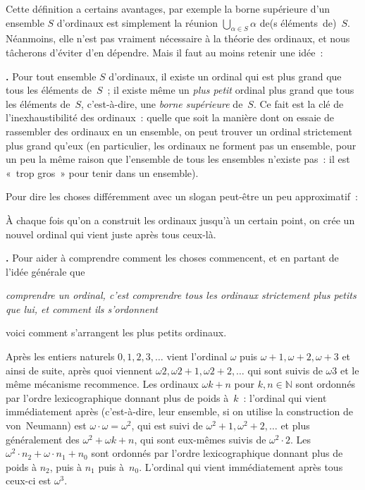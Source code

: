 \documentclass[12pt,a4paper]{article}
\theoremstyle{definition}
\newcommand\thingy{%
\refstepcounter{comcnt}\smallskip\noindent\textbf{\thecomcnt.} }
\begin{document}
Cette définition a certains avantages, par exemple la borne supérieure
d'un ensemble $S$ d'ordinaux est simplement la réunion
$\bigcup_{\alpha\in S} \alpha$ de(s éléments de) $S$.  Néanmoins, elle
n'est pas vraiment nécessaire à la théorie des ordinaux, et nous
tâcherons d'éviter d'en dépendre.  Mais il faut au moins retenir une
idée :

\thingy Pour tout ensemble $S$ d'ordinaux, il existe un ordinal qui est
plus grand que tous les éléments de $S$ ; il existe même un \emph{plus
  petit} ordinal plus grand que tous les éléments de $S$,
c'est-à-dire, une \emph{borne supérieure} de $S$.  Ce fait est la clé
de l'inexhaustibilité des ordinaux : quelle que soit la manière dont
on essaie de rassembler des ordinaux en un ensemble, on peut trouver
un ordinal strictement plus grand qu'eux (en particulier, les ordinaux
ne forment pas un ensemble, pour un peu la même raison que l'ensemble
de tous les ensembles n'existe pas : il est « trop gros » pour tenir
dans un ensemble).

Pour dire les choses différemment avec un slogan peut-être un peu
approximatif :
\begin{center}
À chaque fois qu'on a construit les ordinaux jusqu'à un certain point,
on crée un nouvel ordinal qui vient juste après tous ceux-là.
\end{center}

\thingy Pour aider à comprendre comment les choses commencent, et en
partant de l'idée générale que
\begin{center}
\emph{comprendre un ordinal, c'est comprendre tous les ordinaux
  strictement plus petits que lui, et comment ils s'ordonnent}
\end{center}
voici comment s'arrangent les plus petits ordinaux.

Après les entiers naturels $0,1,2,3,\ldots$ vient l'ordinal $\omega$
puis $\omega+1,\omega+2,\omega+3$ et ainsi de suite, après quoi
viennent $\omega 2, \omega 2+1, \omega 2+2,\ldots$ qui sont suivis de
$\omega 3$ et le même mécanisme recommence.  Les ordinaux $\omega k +
n$ pour $k,n\in\mathbb{N}$ sont ordonnés par l'ordre lexicographique
donnant plus de poids à $k$ : l'ordinal qui vient immédiatement après
(c'est-à-dire, leur ensemble, si on utilise la construction de
von Neumann) est $\omega\cdot\omega = \omega^2$, qui est suivi de
$\omega^2+1,\omega^2+2,\ldots$ et plus généralement des $\omega^2 +
\omega k + n$, qui sont eux-mêmes suivis de $\omega^2 \cdot 2$.  Les
$\omega^2 \cdot n_2 + \omega \cdot n_1 + n_0$ sont ordonnés par
l'ordre lexicographique donnant plus de poids à $n_2$, puis à $n_1$
puis à $n_0$.  L'ordinal qui vient immédiatement après tous ceux-ci
est $\omega^3$.
\end{document}
